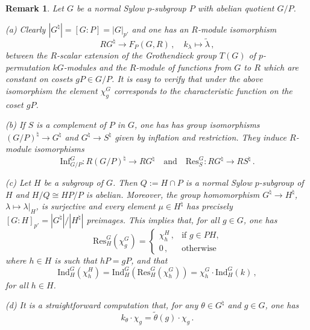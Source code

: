 \documentclass[11pt]{article}
\theoremstyle{change}  %
\newtheorem{remark}[theorem]{Remark}
\newcommand{\Ind}{\mathrm{Ind}}
\newcommand{\Inf}{\mathrm{Inf}}
\newcommand{\Res}{\mathrm{Res}}
\begin{document}
\begin{remark}\label{rem chi}
Let $G$ be a normal Sylow $p$-subgroup $P$ with abelian quotient $G/P$. 

\smallskip
(a) Clearly $|G^\natural|=[G:P]=|G|_{p'}$ and one has an $R$-module isomorphism
\begin{equation*}
   RG^\natural \longrightarrow F_P(G,R)\,, \quad k_\lambda\mapsto\tilde{\lambda}\,,
\end{equation*}
between the $R$-scalar extension of the Grothendieck group $T(G)$ of $p$-permutation $kG$-modules and the $R$-module of functions from $G$ to $R$ which are constant on cosets $gP\in G/P$. 
It is easy to verify that under the above isomorphism the element $\chi^G_{g}$ corresponds to the characteristic function on the coset $gP$. 


(b) If $S$ is a complement of $P$ in $G$, one has  has group isomorphisms $(G/P)^\natural \to G^\natural$ and $G^\natural \to S^\natural$ given by inflation and restriction. They induce $R$-module isomorphisms
\begin{equation*}
   \Inf_{G/P}^G\colon R(G/P)^\natural\to RG^\natural\quad\text{and}\quad \Res^G_S\colon RG^\natural\to RS^\natural\,.
\end{equation*}

\smallskip
(c) Let $H$ be a subgroup of $G$. Then $Q:=H\cap P$ is a normal Sylow $p$-subgroup of $H$ and $H/Q\cong HP/P$ is abelian. Moreover, the group homomorphism $G^\natural\to H^\natural$, $\lambda\mapsto \lambda|_H$, is surjective and every element $\mu\in H^\natural$ has precisely $[G:H]_{p'}=|G^\natural|/|H^\natural|$ preimages. This implies that, for all $g\in G$, one has
\begin{equation*}
   \Res^G_H(\chi^G_g)=\begin{cases} \chi^H_h\,,& \text{if $g\in PH$,}\\ 0\,, & \text{otherwise} \end{cases}
\end{equation*}
where $h\in H$ is such that $hP=gP$, and that
\begin{equation*}
   \Ind_H^G(\chi^H_h)= \Ind_H^G(\Res^G_H(\chi^G_h)) = \chi^G_h\cdot \Ind_H^G(k)\,,
\end{equation*}
for all $h\in H$. 

\smallskip
(d) It is a straightforward computation that, for any $\theta\in G^\natural$ and $g\in G$, one has
\begin{equation*}
   k_\theta\cdot \chi_g = \tilde{\theta}(g)\cdot \chi_g\,.
\end{equation*}


\end{remark}
\end{document}
